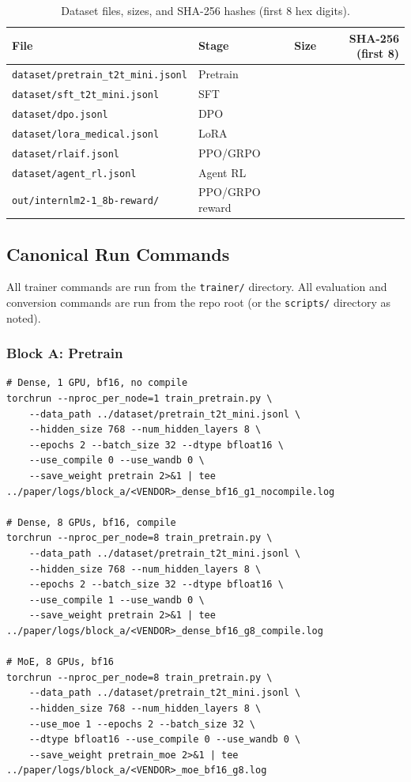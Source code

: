 \begin{table}[h]
\centering
\caption{Dataset files, sizes, and SHA-256 hashes (first 8 hex digits).}
\label{tab:datasets}
\small
\begin{tabular}{llrr}
\toprule
\textbf{File} & \textbf{Stage} & \textbf{Size} & \textbf{SHA-256 (first 8)} \\
\midrule
\texttt{dataset/pretrain\_t2t\_mini.jsonl} & Pretrain  & \PH{} & \PH{} \\
\texttt{dataset/sft\_t2t\_mini.jsonl}      & SFT       & \PH{} & \PH{} \\
\texttt{dataset/dpo.jsonl}                 & DPO       & \PH{} & \PH{} \\
\texttt{dataset/lora\_medical.jsonl}       & LoRA      & \PH{} & \PH{} \\
\texttt{dataset/rlaif.jsonl}               & PPO/GRPO  & \PH{} & \PH{} \\
\texttt{dataset/agent\_rl.jsonl}           & Agent RL  & \PH{} & \PH{} \\
\texttt{out/internlm2-1\_8b-reward/}       & PPO/GRPO reward & \PH{} & \PH{} \\
\bottomrule
\end{tabular}
\end{table}

\subsection{Canonical Run Commands}
\label{sec:appendix:commands}

All trainer commands are run from the \texttt{trainer/} directory.  All
evaluation and conversion commands are run from the repo root (or the
\texttt{scripts/} directory as noted).

\subsubsection{Block A: Pretrain}

\begin{verbatim}
# Dense, 1 GPU, bf16, no compile
torchrun --nproc_per_node=1 train_pretrain.py \
    --data_path ../dataset/pretrain_t2t_mini.jsonl \
    --hidden_size 768 --num_hidden_layers 8 \
    --epochs 2 --batch_size 32 --dtype bfloat16 \
    --use_compile 0 --use_wandb 0 \
    --save_weight pretrain 2>&1 | tee ../paper/logs/block_a/<VENDOR>_dense_bf16_g1_nocompile.log

# Dense, 8 GPUs, bf16, compile
torchrun --nproc_per_node=8 train_pretrain.py \
    --data_path ../dataset/pretrain_t2t_mini.jsonl \
    --hidden_size 768 --num_hidden_layers 8 \
    --epochs 2 --batch_size 32 --dtype bfloat16 \
    --use_compile 1 --use_wandb 0 \
    --save_weight pretrain 2>&1 | tee ../paper/logs/block_a/<VENDOR>_dense_bf16_g8_compile.log

# MoE, 8 GPUs, bf16
torchrun --nproc_per_node=8 train_pretrain.py \
    --data_path ../dataset/pretrain_t2t_mini.jsonl \
    --hidden_size 768 --num_hidden_layers 8 \
    --use_moe 1 --epochs 2 --batch_size 32 \
    --dtype bfloat16 --use_compile 0 --use_wandb 0 \
    --save_weight pretrain_moe 2>&1 | tee ../paper/logs/block_a/<VENDOR>_moe_bf16_g8.log
\end{verbatim}

